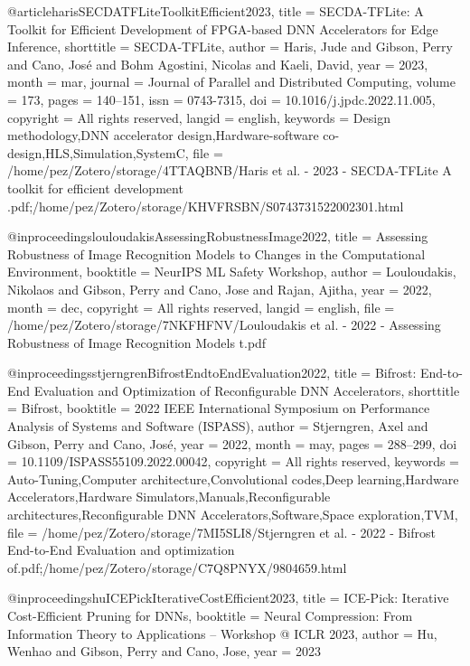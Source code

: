 @article{harisSECDATFLiteToolkitEfficient2023,
  title = {{{SECDA-TFLite}}: {{A}} Toolkit for Efficient Development of {{FPGA-based DNN}} Accelerators for Edge Inference},
  shorttitle = {{{SECDA-TFLite}}},
  author = {Haris, Jude and Gibson, Perry and Cano, Jos{\'e} and Bohm Agostini, Nicolas and Kaeli, David},
  year = {2023},
  month = mar,
  journal = {Journal of Parallel and Distributed Computing},
  volume = {173},
  pages = {140--151},
  issn = {0743-7315},
  doi = {10.1016/j.jpdc.2022.11.005},
  copyright = {All rights reserved},
  langid = {english},
  keywords = {Design methodology,DNN accelerator design,Hardware-software co-design,HLS,Simulation,SystemC},
  file = {/home/pez/Zotero/storage/4TTAQBNB/Haris et al. - 2023 - SECDA-TFLite A toolkit for efficient development .pdf;/home/pez/Zotero/storage/KHVFRSBN/S0743731522002301.html}
}

@inproceedings{louloudakisAssessingRobustnessImage2022,
  title = {Assessing {{Robustness}} of {{Image Recognition Models}} to {{Changes}} in the {{Computational Environment}}},
  booktitle = {{{NeurIPS ML Safety Workshop}}},
  author = {Louloudakis, Nikolaos and Gibson, Perry and Cano, Jose and Rajan, Ajitha},
  year = {2022},
  month = dec,
  copyright = {All rights reserved},
  langid = {english},
  file = {/home/pez/Zotero/storage/7NKFHFNV/Louloudakis et al. - 2022 - Assessing Robustness of Image Recognition Models t.pdf}
}

@inproceedings{stjerngrenBifrostEndtoEndEvaluation2022,
  title = {Bifrost: {{End-to-End Evaluation}} and Optimization of {{Reconfigurable DNN Accelerators}}},
  shorttitle = {Bifrost},
  booktitle = {2022 {{IEEE International Symposium}} on {{Performance Analysis}} of {{Systems}} and {{Software}} ({{ISPASS}})},
  author = {Stjerngren, Axel and Gibson, Perry and Cano, Jos{\'e}},
  year = {2022},
  month = may,
  pages = {288--299},
  doi = {10.1109/ISPASS55109.2022.00042},
  copyright = {All rights reserved},
  keywords = {Auto-Tuning,Computer architecture,Convolutional codes,Deep learning,Hardware Accelerators,Hardware Simulators,Manuals,Reconfigurable architectures,Reconfigurable DNN Accelerators,Software,Space exploration,TVM},
  file = {/home/pez/Zotero/storage/7MI5SLI8/Stjerngren et al. - 2022 - Bifrost End-to-End Evaluation and optimization of.pdf;/home/pez/Zotero/storage/C7Q8PNYX/9804659.html}
}

@inproceedings{huICEPickIterativeCostEfficient2023,
  title = {{{ICE-Pick}}: {{Iterative Cost-Efficient Pruning}} for {{DNNs}}},
  booktitle = {Neural {{Compression}}: {{From Information Theory}} to {{Applications}} -- {{Workshop}} @ {{ICLR}} 2023},
  author = {Hu, Wenhao and Gibson, Perry and Cano, Jose},
  year = {2023}
}
